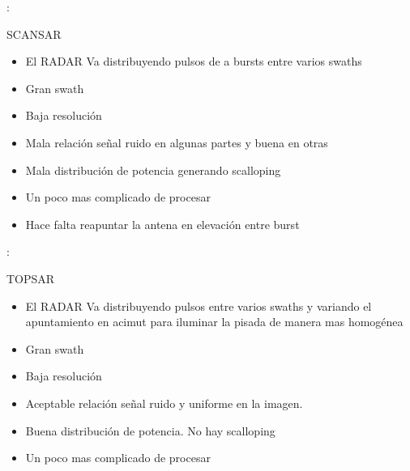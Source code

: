 \begin{frame}{\secname : \subsecname}
    \begin{block}{SCANSAR}
      \begin{itemize}
        \item El RADAR Va distribuyendo pulsos de  a bursts entre varios swaths
        \item Gran swath
        \item Baja resolución
        \item Mala relación señal ruido en algunas partes y buena en otras
        \item Mala distribución de potencia generando scalloping
        \item Un poco mas complicado de procesar
        \item Hace falta reapuntar la antena en elevación entre burst
      \end{itemize}
    \end{block}
\end{frame}

\begin{frame}{\secname : \subsecname}
    \begin{block}{TOPSAR}
      \begin{itemize}
        \item El RADAR Va distribuyendo pulsos entre varios swaths y variando el apuntamiento en acimut para iluminar la pisada de manera mas homogénea
        \item Gran swath
        \item Baja resolución
        \item Aceptable relación señal ruido y uniforme en la imagen.
        \item Buena distribución de potencia. No hay scalloping
        \item Un poco mas complicado de procesar
      \end{itemize}
    \end{block}
\end{frame}

